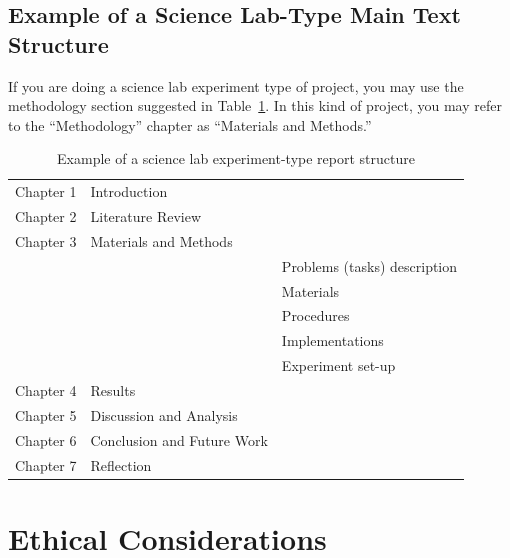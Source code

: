 \subsection{Example of a Science Lab-Type Main Text Structure}
\label{subsec:lab_struct}
If you are doing a science lab experiment type of project, you may use the 
methodology section suggested in Table~\ref{tab:lab_temp}. In this kind of 
project, you may refer to the ``Methodology'' chapter as ``Materials and Methods.''

\begin{table}[!ht]
    \centering
    \caption{Example of a science lab experiment-type report structure}
    \label{tab:lab_temp}
    \begin{tabular}{lll}
        \toprule
        Chapter 1 & Introduction  &    \\
        Chapter 2 & Literature Review  &    \\
        Chapter 3 & Materials and Methods   &    \\
        &               & Problems (tasks) description  \\
        &               & Materials \\
        &               & Procedures  \\
        &               & Implementations   \\
        &               & Experiment set-up   \\
        Chapter 4 & Results       &  \\
        Chapter 5 & Discussion and Analysis  &    \\
        Chapter 6 & Conclusion and Future Work  &    \\
        Chapter 7 & Reflection  &    \\
        \bottomrule
    \end{tabular}
\end{table}

\section{Ethical Considerations}
\label{sec:ethics}

